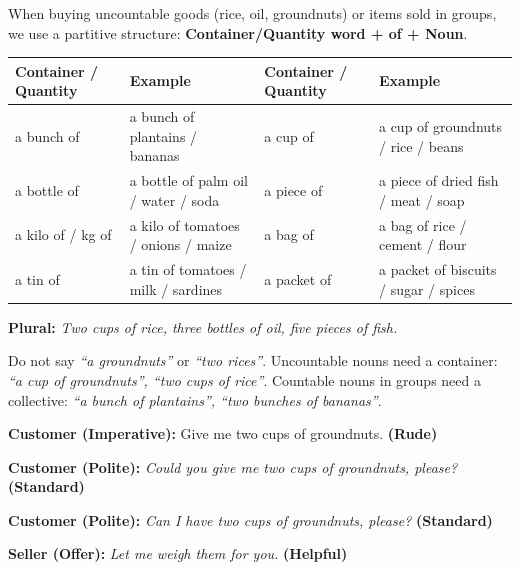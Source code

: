 \documentclass[11pt]{article}
\newcommand{\cle}[1]{{\popxbold\color{popdark}#1}}
\begin{document}
\begin{definition}
When buying uncountable goods (rice, oil, groundnuts) or items sold in groups, we use a \cle{partitive structure}: \textbf{Container/Quantity word + of + Noun}.
\begin{center}
\begin{tabularx}{\linewidth}{|l|X|l|X|}
\hline
\rowcolor{popblueL} \textbf{Container / Quantity} & \textbf{Example} & \textbf{Container / Quantity} & \textbf{Example} \\
\hline
a \cle{bunch of} & a bunch of plantains / bananas & a \cle{cup of} & a cup of groundnuts / rice / beans \\
\hline
a \cle{bottle of} & a bottle of palm oil / water / soda & a \cle{piece of} & a piece of dried fish / meat / soap \\
\hline
a \cle{kilo of} / \cle{kg of} & a kilo of tomatoes / onions / maize & a \cle{bag of} & a bag of rice / cement / flour \\
\hline
a \cle{tin of} & a tin of tomatoes / milk / sardines & a \cle{packet of} & a packet of biscuits / sugar / spices \\
\hline
\end{tabularx}
\end{center}
\textbf{Plural:} \emph{Two cups of rice, three bottles of oil, five pieces of fish.}
\end{definition}

\begin{attention}
Do not say \emph{``a groundnuts''} or \emph{``two rices''}. Uncountable nouns need a container: \emph{``a cup of groundnuts'', ``two cups of rice''}. Countable nouns in groups need a collective: \emph{``a bunch of plantains'', ``two bunches of bananas''}.
\end{attention}

\begin{exemplebox}
\textbf{Customer (Imperative):} Give me two cups of groundnuts. \textbf{(Rude)}\par
\textbf{Customer (Polite):} \emph{Could you give me two cups of groundnuts, please?} \textbf{(Standard)}\par
\textbf{Customer (Polite):} \emph{Can I have two cups of groundnuts, please?} \textbf{(Standard)}\par
\textbf{Seller (Offer):} \emph{Let me weigh them for you.} \textbf{(Helpful)}
\end{exemplebox}
\end{document}
